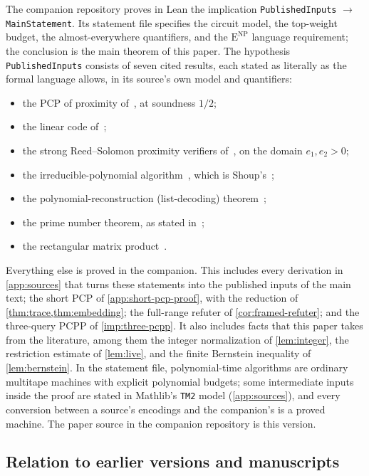 \documentclass[11pt,letterpaper]{article}
\theoremstyle{definition}
\theoremstyle{remark}
\newcommand{\ENP}{\mathrm{E}^{\mathrm{NP}}}
\begin{document}
The companion repository proves in Lean the implication
\texttt{PublishedInputs} $\to$ \texttt{MainStatement}. Its statement
file specifies the circuit model, the top-weight budget, the
almost-everywhere quantifiers, and the \(\ENP\) language requirement;
the conclusion is the main theorem of this paper. The hypothesis
\texttt{PublishedInputs} consists of seven cited results, each stated as
literally as the formal language allows, in its source's own model and
quantifiers:
\begin{itemize}
\item the PCP of proximity of~\cite[Lemma~22]{CW19}, at soundness
\(1/2\);
\item the linear code of~\cite[Lemma~26]{CW19};
\item the strong Reed--Solomon proximity verifiers
of~\cite[Theorem~11.1]{BCGT13}, on the domain \(e_1,e_2>0\);
\item the irreducible-polynomial algorithm~\cite[Algorithm~17]{BCGT13},
which is Shoup's~\cite[Corollary~3.2]{Sho88};
\item the polynomial-reconstruction (list-decoding)
theorem~\cite[Theorem~29]{STV01};
\item the prime number theorem, as stated in~\cite[Chapter~4]{Apostol76};
\item the rectangular matrix product~\cite[Corollary~4.4]{WilACC14}.
\end{itemize}
Everything else is proved in the companion. This includes every
derivation in \cref{app:sources} that turns these statements into the
published inputs of the main text; the short PCP of
\cref{app:short-pcp-proof}, with the reduction of
\cref{thm:trace,thm:embedding}; the full-range refuter of
\cref{cor:framed-refuter}; and the three-query PCPP of
\cref{imp:three-pcpp}. It also includes facts that this paper takes
from the literature, among them the integer normalization of
\cref{lem:integer}, the restriction estimate of \cref{lem:live}, and the
finite Bernstein inequality of \cref{lem:bernstein}. In the statement
file, polynomial-time algorithms are ordinary multitape machines with
explicit polynomial budgets; some intermediate inputs inside the proof
are stated in Mathlib's \texttt{TM2} model (\cref{app:sources}), and
every conversion between a source's encodings and the companion's is a
proved machine. The paper source in the companion
repository is this version.

\subsection{Relation to earlier versions and manuscripts}
\end{document}
